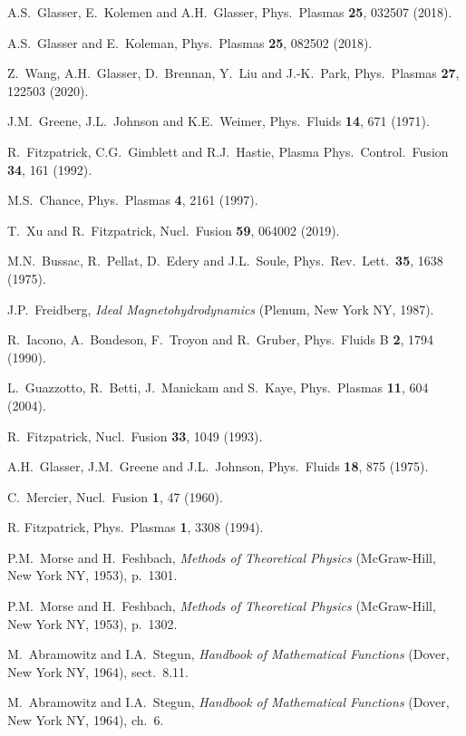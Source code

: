 \documentclass[12pt,prb,aps]{revtex4-1}
\begin{document}
\begin{thebibliography}{99}
 A.S.~Glasser, E.~Kolemen and A.H.~Glasser, Phys.\ Plasmas {\bf 25}, 032507 (2018).

 A.S.~Glasser and E.~Koleman, Phys.\ Plasmas {\bf 25}, 082502 (2018). 

 Z.~Wang, A.H.~Glasser, D.~Brennan, Y.~Liu and J.-K.~Park, Phys.\ Plasmas {\bf 27}, 122503 (2020).

 J.M.~Greene, J.L.~Johnson and K.E.~Weimer,  Phys.\  Fluids  {\bf 14}, 671 (1971).

 R.~Fitzpatrick, C.G.~Gimblett and R.J.~Hastie, Plasma Phys.\ Control.\ Fusion {\bf 34}, 161 (1992). 

 M.S.~Chance, Phys.\ Plasmas {\bf 4}, 2161 (1997).

 T.~Xu and R.~Fitzpatrick, Nucl.\ Fusion {\bf 59}, 064002 (2019).

 M.N.~Bussac, R.~Pellat, D.~Edery and J.L.~Soule, Phys.\ Rev.\ Lett.\ {\bf 35}, 1638 (1975).

 J.P.~Freidberg, {\em Ideal Magnetohydrodynamics}\/ (Plenum, New York NY, 1987).

 R.~Iacono, A.~Bondeson, F.~Troyon and R.~Gruber, Phys.\ Fluids B {\bf 2}, 1794 (1990).

 L.~Guazzotto,  R.~Betti, J.~Manickam and  S.~Kaye, Phys.\ Plasmas {\bf 11}, 604 (2004).

 R.~Fitzpatrick, Nucl.\ Fusion {\bf 33}, 1049 (1993).

 A.H.~Glasser, J.M.~Greene and J.L.~Johnson, Phys.\ Fluids {\bf 18}, 875 (1975).

 C.~Mercier, Nucl.\ Fusion {\bf 1}, 47 (1960).

 R. Fitzpatrick, Phys.\ Plasmas {\bf 1}, 3308 (1994).

 P.M.~Morse and H.~Feshbach, {\em Methods of Theoretical Physics}\/ (McGraw-Hill, New York NY, 1953), p.~1301.

 P.M.~Morse and H.~Feshbach, {\em Methods of Theoretical Physics}\/ (McGraw-Hill, New York NY, 1953), p.~1302.

 M.~Abramowitz and I.A.~Stegun, {\em Handbook of Mathematical Functions}\/ (Dover, New York NY, 1964), sect.~8.11.

 M.~Abramowitz and I.A.~Stegun, {\em Handbook of Mathematical Functions}\/ (Dover, New York NY, 1964), ch.~6.


\end{thebibliography}
\end{document}
